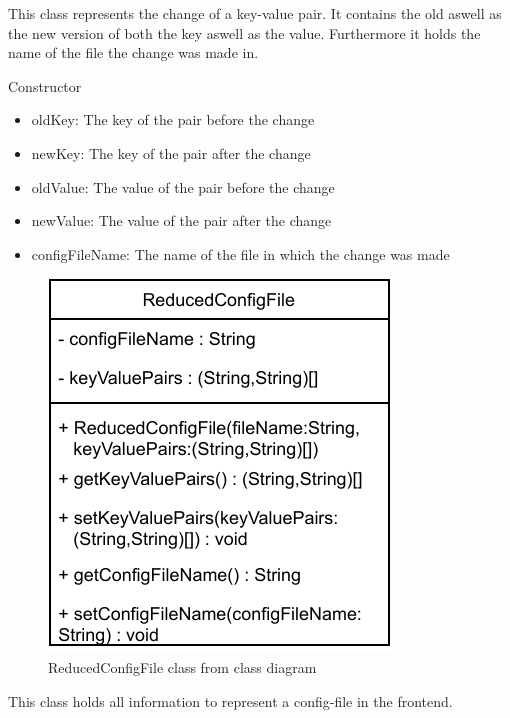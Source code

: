 This class represents the change of a key-value pair. It contains the old aswell as the new version of both the key aswell as the value. Furthermore it holds the name of the file the change was made in.

\begin{methodenv}{Constructor}
\begin{itemize}
	\item{oldKey:}
	The key of the pair before the change
	\item{newKey:}
	The key of the pair after the change
	\item{oldValue:}
	The value of the pair before the change
	\item{newValue:}
	The value of the pair after the change
	\item{configFileName:}
	The name of the file in which the change was made
\end{itemize}
\end{methodenv}



\begin{figure}[h]
\centerline{\includegraphics[scale=1]{res/Klassen/ReducedConfigFile.pdf}}
\caption{ReducedConfigFile class from class diagram}
\end{figure}

This class holds all information to represent a config-file in the frontend.

